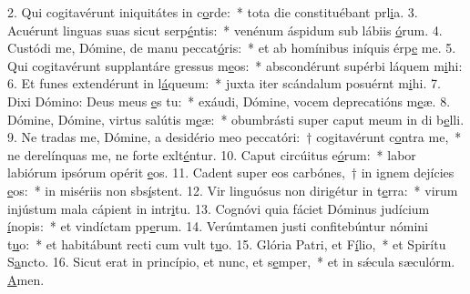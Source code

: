 2. Qui cogitavérunt iniquitátes in c\uline{o}rde:~* tota die constituébant prl\uline{i}a.
3. Acuérunt linguas suas sicut serp\uline{é}ntis:~* venénum áspidum sub lábiis \uline{ó}rum.
4. Custódi me, Dómine, de manu peccat\uline{ó}ris:~* et ab homínibus iníquis érp\uline{e} me.
5. Qui cogitavérunt supplantáre gressus m\uline{e}os:~* abscondérunt supérbi láquem m\uline{i}hi:
6. Et funes extendérunt in l\uline{á}queum:~* juxta iter scándalum posuérnt m\uline{i}hi.
7. Dixi Dómino: Deus meus \uline{e}s tu:~* exáudi, Dómine, vocem deprecatións m\uline{e}æ.
8. Dómine, Dómine, virtus salútis m\uline{e}æ:~* obumbrásti super caput meum in di b\uline{e}lli.
9. Ne tradas me, Dómine, a desidério meo peccatóri:~† cogitavérunt c\uline{o}ntra me,~* ne derelínquas me, ne forte exlt\uline{é}ntur.
10. Caput circúitus e\uline{ó}rum:~* labor labiórum ipsórum opérit \uline{e}os.
11. Cadent super eos carbónes,~† in ignem dejícies \uline{e}os:~* in misériis non sbs\uline{í}stent.
12. Vir linguósus non dirigétur in t\uline{e}rra:~* virum injústum mala cápient in intr\uline{i}tu.
13. Cognóvi quia fáciet Dóminus judícium \uline{í}nopis:~* et vindíctam pp\uline{e}rum.
14. Verúmtamen justi confitebúntur nómini t\uline{u}o:~* et habitábunt recti cum vult t\uline{u}o.
15. Glória Patri, et F\uline{í}lio,~* et Spirítu S\uline{a}ncto.
16. Sicut erat in princípio, et nunc, et s\uline{e}mper,~* et in sǽcula sæculórm. \uline{A}men.
